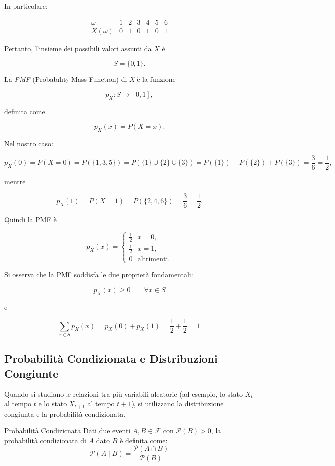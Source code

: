 In particolare:

\[
\begin{array}{c|cccccc}
\omega & 1 & 2 & 3 & 4 & 5 & 6\\
\hline
X(\omega) & 0 & 1 & 0 & 1 & 0 & 1
\end{array}
\]

Pertanto, l'insieme dei possibili valori assunti da \(X\) è

\[
S=\{0,1\}.
\]

La \emph{PMF} (Probability Mass Function) di $X$ è la funzione

\[
p_X:S\to[0,1],
\]

definita come

\[
p_X(x)=P(X=x).
\]

Nel nostro caso:

\[
p_X(0)=P(X=0)
=P(\{1,3,5\})=P(\{1\} \cup \{2\} \cup \{3\}) = P(\{1\}) + P(\{2\}) + P(\{3\})
=\frac{3}{6}
=\frac12,
\]

mentre

\[
p_X(1)=P(X=1)
=P(\{2,4,6\})
=\frac{3}{6}
=\frac12.
\]

Quindi la PMF è

\[
\boxed{
p_X(x)=
\begin{cases}
\frac12 & x=0,\\
\frac12 & x=1,\\
0 & \text{altrimenti}.
\end{cases}}
\]

Si osserva che la PMF soddisfa le due proprietà fondamentali:

\[
p_X(x)\geq 0
\qquad \forall x\in S
\]

e

\[
\sum_{x\in S}p_X(x)
=
p_X(0)+p_X(1)
=
\frac12+\frac12
=1.
\]



\subsection{Probabilità Condizionata e Distribuzioni Congiunte}

Quando si studiano le relazioni tra più variabili aleatorie (ad esempio, lo stato $X_t$ al tempo $t$ e lo stato $X_{t+1}$ al tempo $t+1$), si utilizzano la distribuzione congiunta e la probabilità condizionata.

\begin{definition}{Probabilità Condizionata}
Dati due eventi $A, B \in \mathcal{F}$ con $\mathcal{P}(B) > 0$, la probabilità condizionata di $A$ dato $B$ è definita come:
\[
\mathcal{P}(A \mid B) = \frac{\mathcal{P}(A \cap B)}{\mathcal{P}(B)}
\]
\end{definition}


